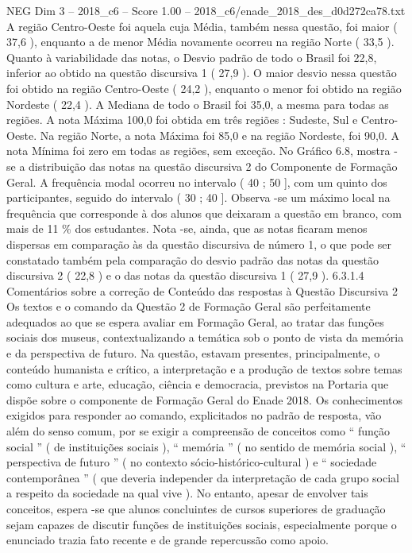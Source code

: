 \begin{textsample}{NEG Dim 3 – 2018\_c6 – Score 1.00 – 2018\_c6/enade\_2018\_des\_d0d272ca78.txt}
A região Centro-Oeste foi aquela cuja Média, também nessa questão, foi maior ( 37,6 ), enquanto a de menor Média novamente ocorreu na região Norte ( 33,5 ).
Quanto à variabilidade das notas, o Desvio padrão de todo o Brasil foi 22,8, inferior ao obtido na questão discursiva 1 ( 27,9 ).
O maior desvio nessa questão foi obtido na região Centro-Oeste ( 24,2 ), enquanto o menor foi obtido na região Nordeste ( 22,4 ).
A Mediana de todo o Brasil foi 35,0, a mesma para todas as regiões.
A nota Máxima 100,0 foi obtida em três regiões : Sudeste, Sul e Centro-Oeste.
Na região Norte, a nota Máxima foi 85,0 e na região Nordeste, foi 90,0.
A nota Mínima foi zero em todas as regiões, sem exceção.
No Gráfico 6.8, mostra -se a distribuição das notas na questão discursiva 2 do Componente de Formação Geral.
A frequência modal ocorreu no intervalo ( 40 ; 50 ], com um quinto dos participantes, seguido do intervalo ( 30 ; 40 ].
Observa -se um máximo local na frequência que corresponde à dos alunos que deixaram a questão em branco, com mais de 11 \% dos estudantes.
Nota -se, ainda, que as notas ficaram menos dispersas em comparação às da questão discursiva de número 1, o que pode ser constatado também pela comparação do desvio padrão das notas da questão discursiva 2 ( 22,8 ) e o das notas da questão discursiva 1 ( 27,9 ). 6.3.1.4 Comentários sobre a correção de Conteúdo das respostas à Questão Discursiva 2 Os textos e o comando da Questão 2 de Formação Geral são perfeitamente adequados ao que se espera avaliar em Formação Geral, ao tratar das funções sociais dos museus, contextualizando a temática sob o ponto de vista da memória e da perspectiva de futuro.
Na questão, estavam presentes, principalmente, o conteúdo humanista e crítico, a interpretação e a produção de textos sobre temas como cultura e arte, educação, ciência e democracia, previstos na Portaria que dispõe sobre o componente de Formação Geral do Enade 2018.
Os conhecimentos exigidos para responder ao comando, explicitados no padrão de resposta, vão além do senso comum, por se exigir a compreensão de conceitos como “ função social ” ( de instituições sociais ), “ memória ” ( no sentido de memória social ), “ perspectiva de futuro ” ( no contexto sócio-histórico-cultural ) e “ sociedade contemporânea ” ( que deveria independer da interpretação de cada grupo social a respeito da sociedade na qual vive ).
No entanto, apesar de envolver tais conceitos, espera -se que alunos concluintes de cursos superiores de graduação sejam capazes de discutir funções de instituições sociais, especialmente porque o enunciado trazia fato recente e de grande repercussão como apoio.

\end{textsample}
